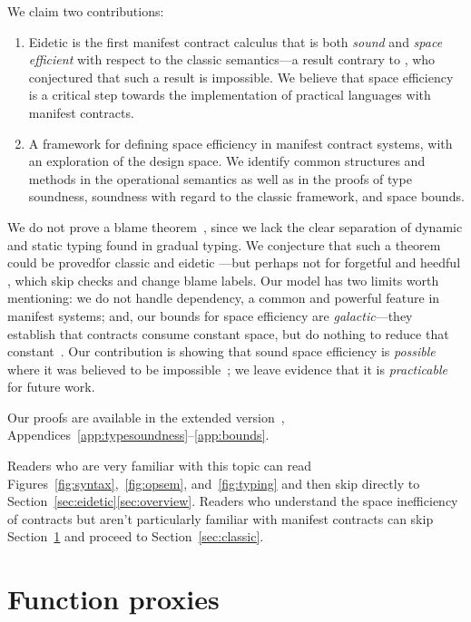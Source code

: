 \documentclass[9pt]{extarticle}
\begin{document}
\iffull
We claim two contributions:
\begin{enumerate}
\item \fi Eidetic \lambdah is the first manifest contract calculus that is
  both \textit{sound} and \textit{space efficient} with respect to the
  classic semantics---a result contrary to \citet{Greenberg13thesis},
  who conjectured that such a result is impossible. We believe that
  space efficiency is a critical step towards the implementation of
  practical languages with manifest contracts.

\iffull
\item A framework for defining space efficiency in manifest contract
  systems, with an exploration of the design space. We identify common
  structures and methods in the operational semantics as well as in
  the proofs of type soundness, soundness with regard to the classic
  framework, and space bounds.
\end{enumerate} \fi
We do not prove a blame theorem~\cite{Tobin-Hochstadt06interlanguage}, since we lack
the clear separation of dynamic and static typing found in gradual
typing. We conjecture that such a theorem could be proved\iffull for classic
and eidetic \lambdah---but perhaps not for forgetful and heedful
\lambdah, which skip checks and change blame labels\fi.
Our model has two limits worth mentioning: we do not handle
dependency, a common and powerful feature in manifest systems; and,
our bounds for space efficiency are \textit{galactic}---they establish
that contracts consume constant space, but do nothing to reduce that
constant~\cite{Lipton10galactic}. Our contribution is showing that
sound space efficiency is \textit{possible} where it was believed to
be impossible~\cite{Greenberg13thesis}; we leave evidence
that it is \textit{practicable} for future work.


Our proofs are available in the extended
version~\cite{Greenberg14spacetr},
Appendices~\ref{app:typesoundness}--\ref{app:bounds}.

Readers who are very familiar with this topic can read
Figures~\ref{fig:syntax},~\ref{fig:opsem}, and~\ref{fig:typing} and
then skip directly to Section~\ifpopl\ref{sec:eidetic}\else\ref{sec:overview}\fi.
Readers who understand the space inefficiency of contracts but aren't
particularly familiar with manifest contracts can skip
Section~\ref{sec:inefficiency} and proceed to
Section~\ref{sec:classic}.

\section{Function proxies}
\label{sec:inefficiency}
\end{document}
